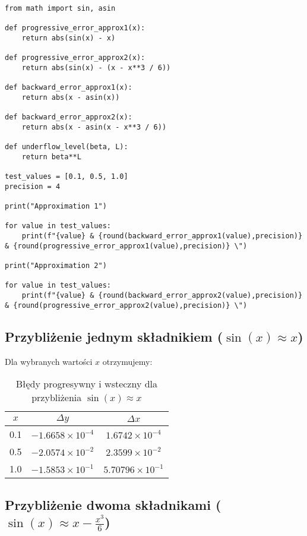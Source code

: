 \documentclass{article}
\begin{document}
\begin{verbatim}
from math import sin, asin

def progressive_error_approx1(x):
    return abs(sin(x) - x)

def progressive_error_approx2(x):
    return abs(sin(x) - (x - x**3 / 6))

def backward_error_approx1(x):
    return abs(x - asin(x))

def backward_error_approx2(x):
    return abs(x - asin(x - x**3 / 6))

def underflow_level(beta, L):
    return beta**L

test_values = [0.1, 0.5, 1.0]
precision = 4

print("Approximation 1")

for value in test_values:
    print(f"{value} & {round(backward_error_approx1(value),precision)} & {round(progressive_error_approx1(value),precision)} \")

print("Approximation 2")

for value in test_values:
    print(f"{value} & {round(backward_error_approx2(value),precision)} & {round(progressive_error_approx2(value),precision)} \")

\end{verbatim}

\subsection{Przybliżenie jednym składnikiem ($\sin(x) \approx x$)}

Dla wybranych wartości $x$ otrzymujemy:

\begin{table}[H]
    \centering
    \begin{tabular}{c|cc}
         $x$ & $\Delta y$ & $\Delta x$ \\
         \hline
         0.1 & $-1.6658\times10^{-4}$ & $1.6742\times10^{-4}$ \\
         0.5 & $-2.0574\times10^{-2}$ & $2.3599\times10^{-2}$ \\
         1.0 & $-1.5853\times10^{-1}$ & $5.70796\times10^{-1}$ \\
    \end{tabular}
    \caption{Błędy progresywny i wsteczny dla przybliżenia $\sin(x)\approx x$}
    \label{tab:one_term}
\end{table}

\subsection{Przybliżenie dwoma składnikami ($\sin(x) \approx x - \frac{x^3}{6}$)}
\end{document}
